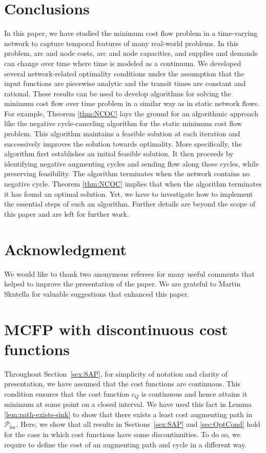 \documentclass{svjour3}                     \smartqed
\newcommand{\loc}{\ensuremath{\text{loc}}}
\begin{document}
\section{Conclusions}
\label{sec:con}
In this paper, we have studied the minimum cost flow problem in a time-varying network to capture temporal features of many real-world problems. In this problem, arc and node costs, arc and node capacities, and supplies and demands can change over time where time is modeled as a continuum. We developed several network-related optimality conditions under the assumption that the input functions are piecewise analytic and the transit times are constant and rational. These results can be used to develop algorithms for solving the minimum cost flow over time problem in a similar way as in static network flows.  For example, Theorem \ref{thm:NCOC} lays the ground for an algorithmic approach like the negative cycle-canceling algorithm for the static minimum cost flow problem. This algorithm maintains a feasible solution at each iteration and successively improves the solution towards optimality. More specifically, the algorithm first establishes an initial feasible solution. It then proceeds by identifying negative augmenting cycles and sending flow along these cycles, while preserving feasibility. The algorithm terminates when the network contains no negative cycle. Theorem \ref{thm:NCOC} implies that when the algorithm terminates it has found an optimal solution. Yet, we have to investigate how to implement the essential steps of such an algorithm. Further details are beyond the scope of this paper and are left for further work.

\section*{Acknowledgment}
We would like to thank two anonymous referees for many useful comments that helped to improve the presentation of the paper. We are grateful to Martin Skutella for valuable suggestions that enhanced this paper. 




\appendix
\section{MCFP with discontinuous cost functions}
\label{sec:appendix}

Throughout Section~\ref{sex:SAP}, for simplicity of notation and clarity of presentation, we have assumed that the cost functions are continuous. This condition ensures that the cost function $c_Q$ is continuous and hence attains it minimum at some point on a closed interval. We have used this fact in Lemma \ref{lem:path-exists-sink} to show that there exists a least cost augmenting path in $\mathcal{P}_{\loc}$. Here, we show that all results in Sections~\ref{sex:SAP} and \ref{sec:OptCond} hold for the case in which cost functions have some discontinuities. To do so, we require to define the cost of an augmenting path and cycle in a different way.
\end{document}
